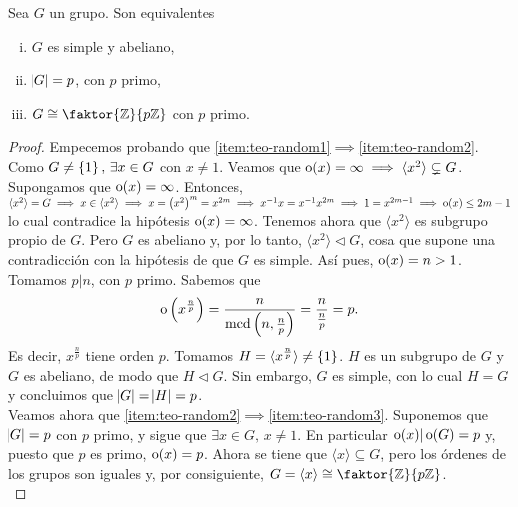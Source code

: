 \begin{teo*}\label{teo:ordprimo}
    Sea $G$ un grupo. Son equivalentes
    \begin{enumerate}[(i)]
        \item\label{item:teo-random1} $G$ es simple y abeliano,
        \item\label{item:teo-random2} $\abs{G} = p$, con $p$ primo,
        \item\label{item:teo-random3} $G \cong \faktor{\z}{p\z}$ con $p$ primo.
    \end{enumerate}
\end{teo*}

\begin{proof}
    Empecemos probando que \ref{item:teo-random1}$\implies$\ref{item:teo-random2}.
    Como $G \neq \left\{1\right\}, \, \exists x \in G$ con $x \neq 1$. Veamos que $\operatorname{o}(x) = \infty \implies
    \langle x^2 \rangle \subsetneq G$. Supongamos que $\operatorname{o}(x) = \infty$. Entonces, $\langle x^2 \rangle = G \implies x \in \langle x^2\rangle
    \implies x = \left( x^2 \right)^m = x^{2m} \implies x^{-1}x = x^{-1}x^{2m} \implies
    1 = x^{2m-1} \implies \operatorname{o}(x) \leq 2m-1$ lo cual contradice la hipótesis $\operatorname{o}(x) = \infty$.
    Tenemos ahora que $\langle x^2 \rangle$ es subgrupo propio de $G$. Pero $G$ es abeliano y, por lo tanto, 
    $\langle x^2 \rangle \triangleleft G$, cosa que supone una contradicción con la hipótesis de que $G$ es simple.
    Así pues, $\operatorname{o}(x) = n > 1$. 
    Tomamos $p \vert n$, con $p$ primo. Sabemos que
    \[
        \operatorname{o}\left( x^{\frac{n}{p}} \right) = \frac{n}{\operatorname{mcd}\left(n, \frac{n}{p}\right)} =
        \frac{n}{\frac{n}{p}} = p.
    \]
    Es decir, $x^{\frac{n}{p}}$ tiene orden $p$. Tomamos $H = \langle x^{\frac{n}{p}}\rangle \neq \left\{1\right\}$.
    $H$ es un subgrupo de $G$ y $G$ es abeliano, de modo que $H \triangleleft G$. Sin embargo, $G$ es simple,
    con lo cual $H = G$ y concluimos que $\abs{G} = \abs{H} = p$.
    \\
    
    \noindent Veamos ahora que \ref{item:teo-random2}$\implies$\ref{item:teo-random3}. Suponemos que $\abs{G} = p$
    con $p$ primo, y sigue que $\exists x \in G, \, x \neq 1$. En particular $\operatorname{o}(x) \vert \operatorname{o}(G) = p$ 
    y, puesto que $p$ es primo, $\operatorname{o}(x) = p$. Ahora se tiene que $\langle x\rangle \subseteq G$, pero los órdenes
    de los grupos son iguales y, por consiguiente, $G = \langle x\rangle \cong \faktor{\z}{p\z}$.
    \\
    

\end{proof}
